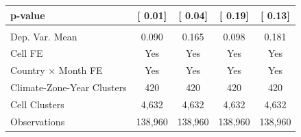 {\begin{tabular}{l*{4}{c}}
\hspace{15pt} p-value&[     0.01]         &[     0.04]         &[     0.19]         &[     0.13]         \\
\hline \\ Dep. Var. Mean& 0.090         & 0.165         & 0.098         & 0.181         \\
Cell FE             &   Yes         &   Yes         &   Yes         &   Yes         \\
Country $\times$ Month FE&   Yes         &   Yes         &   Yes         &   Yes         \\
Climate-Zone-Year Clusters&   420         &   420         &   420         &   420         \\
Cell Clusters       & 4,632         & 4,632         & 4,632         & 4,632         \\
Observations        &138,960         &138,960         &138,960         &138,960         \\
\bottomrule
\end{tabular}
}
